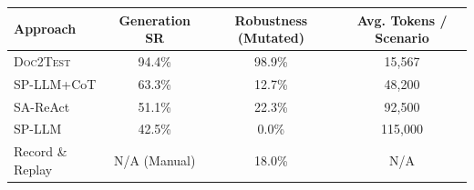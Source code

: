 \begin{tabular}{lccc}
\toprule
\textbf{Approach} & \textbf{Generation SR} & \textbf{Robustness (Mutated)} & \textbf{Avg. Tokens / Scenario} \\
\midrule
\textsc{Doc2Test} & 94.4\% & 98.9\% & 15,567 \\
SP-LLM+CoT & 63.3\% & 12.7\% & 48,200 \\
SA-ReAct & 51.1\% & 22.3\% & 92,500 \\
SP-LLM & 42.5\% & 0.0\% & 115,000 \\
Record \& Replay & N/A (Manual) & 18.0\% & N/A \\
\bottomrule
\end{tabular}
